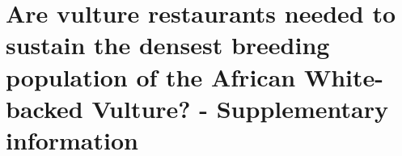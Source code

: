 \chapter{Are vulture restaurants needed to sustain the densest breeding population of the African White-backed Vulture? - Supplementary information}
\label{chap:pdp-supp}


\begin{table}[!htb]
\small %
		\caption[Life history data] %
				{Life history parameters for all of the species in the community under study, values are in years \cite{brown1991declining,pennycuick1976breeding,jones2009pantheria,monadjem2012survival,piper1999modelling,de2009database}.} 
		
		\label{tab:life_hist}
	\end{table}


\begin{table}[H]
\small %
		\caption[Avain scavenger reproductive parameters] %
				{Reproductive parameters for species of the avian scavenging guild (number of descendants corresponds to the number of fledglings for the following species) \cite{mundy1992vultures,monadjem2005nesting,mundy1982comparative,margalida2012modelling}.} 
		
		\label{tab:repro_param}
	\end{table}


\begin{table}[H]
\small %
		\caption[Avain scavenger mortality parameters - adults] %
				{Mortality values for adults of the avian scavenging guild over a year \cite{brown1991declining,pennycuick1976breeding,monadjem2012survival,piper1999modelling,monadjem2013survival}.} 
		
		\label{tab:adult_mort}
	\end{table}


\begin{table}[H]
\small %
		\caption[Avain scavenger mortality parameters - immatures] %
				{Mortality values for immatures of the avian scavenging guild over a year \cite{brown1991declining,pennycuick1976breeding,monadjem2012survival,piper1999modelling,monadjem2013survival}.} 
		
		\label{tab:imm_mort}
	\end{table}

